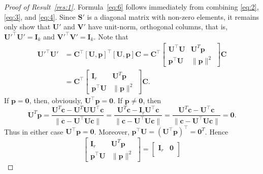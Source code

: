 \documentclass[11pt,a4paper]{article}
\theoremstyle{mybreak}
\numberwithin{dummy}{section}
\theoremstyle{plain}
\theoremstyle{plain}
\theoremstyle{plain}
\theoremstyle{plain}
\theoremstyle{MyNonumberplain}
\newtheorem{proof}{Proof}
\newcommand{\0}{\M{0}}
\newcommand{\M}[1]{\mathbf{#1}}
\newcommand{\T}{\top}
\newcommand{\ve}[1]{\mathbf{#1}}
\begin{document}
\begin{proof}[Proof of Result~\ref{res:1}]
  Formula~\eqref{eq:6} follows immediately from combining \eqref{eq:2}, \eqref{eq:3}, and \eqref{eq:4}.  Since $\M{S}'$ is a diagonal matrix with non-zero elements, it remains only show that $\M{U}'$ and $\M{V}' $ have unit-norm, orthogonal columns, that is, 
  \begin{math}
    \M{U}'^\T \M{U}' = \M{I}_k
  \end{math}
  and
  \begin{math}
    \M{V}'^\T \M{V}' = \M{I}_k.
  \end{math}
  Note that
  \begin{equation}
    \label{eq:8}
    \begin{split}
      \M{U}'^\T \M{U}' & = \M{C}^\T [\M{U}, \ve{p}]^\T [\M{U}, \ve{p}] \M{C} = \M{C}^\T
      \begin{bmatrix}
        \M{U}^\T \M{U} & \M{U}^T \ve{p} \\
        \ve{p}^\T \M{U} & \| \ve{p} \|^2
      \end{bmatrix}
      \M{C}
      \\
      & = \M{C}^\T
      \begin{bmatrix}
        \M{I}_r & \M{U}^T \ve{p} \\
        \ve{p}^\T \M{U} & \| \ve{p} \|^2
      \end{bmatrix}
      \M{C}.
    \end{split}
  \end{equation}
  If $\ve{p} = \0$, then, obviously, $\M{U}^\T \ve{p} = \0$.  If $\ve{p} \neq \0$, then
  \begin{displaymath}
    \M{U}^T \ve{p}
    =  \frac{\M{U}^T \ve{c} - \M{U}^T \M{U} \M{U}^\T \ve{c}}
    {\| \ve{c} - \M{U}^\T \M{U} \ve{c}\|}
    =
    \frac{\M{U}^T \ve{c} - \M{I}_r \M{U}^\T \ve{c}}
    {\| \ve{c} - \M{U}^\T \M{U} \ve{c}\|}
    =
    \frac{\M{U}^T \ve{c} - \M{U}^\T \ve{c}}
    {\| \ve{c} - \M{U}^\T \M{U} \ve{c}\|}
    =
    \0.
  \end{displaymath}
  Thus in either case $\M{U}^\T \ve{p} = \0$. Moreover, $\ve{p}^\T \M{U} = (\M{U}^\T \ve{p})^\T = \0^T$. Hence
  \begin{displaymath}
    \begin{bmatrix}
      \M{I}_r & \M{U}^T \ve{p} \\
      \ve{p}^\T \M{U} & \| \ve{p} \|^2
    \end{bmatrix}
    =
    \begin{bmatrix}
      \M{I}_r & \0 \\

\end{bmatrix}
\end{displaymath}
\end{proof}
\end{document}

